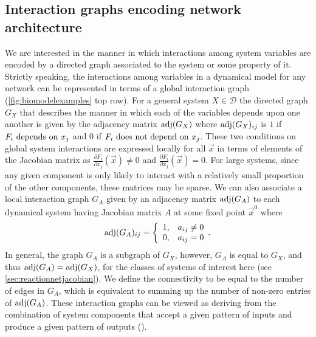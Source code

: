 \subsection{Interaction graphs encoding network architecture}
We are interested in the manner in which interactions among system variables are encoded by a directed graph associated to the system or some property of it. Strictly speaking, the interactions among variables in a dynamical model for any network can be represented in terms of a global interaction graph (\ref{fig:biomodelexamples} top row).
For a general system $X \in \mathcal{D}$ the directed graph $G_X$ that describes the manner in which each of the variables depends upon one another is given by the adjacency matrix $\mathrm{adj}(G_X)$ where $\mathrm{adj}(G_X)_{ij}$ is $1$ if $F_i \hbox{ depends on } x_j$ and $0$ if $F_i \hbox{ does not depend on } x_j$. These two conditions on global system interactions are expressed locally for all $\vec{x}$ in terms of elements of the Jacobian matrix as $\frac{\partial F_i}{\partial x_j}(\vec{x}) \neq 0$ and $\frac{\partial F_i}{\partial x_j}(\vec{x}) = 0$.
For large systems, since any given component is only likely to interact with a relatively small proportion of the other components, these matrices may be sparse.
We can also associate a local interaction graph $G_A$ given by an adjacency matrix $\mathrm{adj}(G_A)$ to each dynamical system having Jacobian matrix $A$ at some fixed point $\vec{x}^0$ where
 \begin{equation}\label{eq:lininterdepadj}
   \mathrm{adj}(G_A)_{ij} = \left\{
     \begin{array}{lr}
       1, & a_{ij} \neq 0\\
       0, & a_{ij} = 0
     \end{array}.
   \right.
\end{equation}
In general, the graph $G_A$ is a subgraph of $G_X$, however, $G_A$ is equal to $G_X$, and thus $\mathrm{adj}(G_A) = \mathrm{adj}(G_X)$, for the classes of systems of interest here (see  \ref{sec:reactionnetjacobian}). We define the connectivity to be equal to the number of edges in $G_A$, which is equivalent to summing up the number of non-zero entries of $\mathrm{adj}(G_A)$.
These interaction graphs can be viewed as deriving from the combination of system components that accept a given pattern of inputs and produce a given pattern of outputs ().

